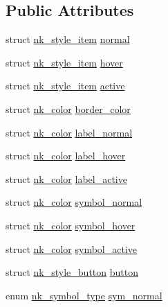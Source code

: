 \subsection*{Public Attributes}
\begin{DoxyCompactItemize}
\item 
struct \mbox{\hyperlink{structnk__style__item}{nk\+\_\+style\+\_\+item}} \mbox{\hyperlink{structnk__style__combo_a4eb30990e9b05c237cb40ddcd75fbc84}{normal}}
\item 
struct \mbox{\hyperlink{structnk__style__item}{nk\+\_\+style\+\_\+item}} \mbox{\hyperlink{structnk__style__combo_a7e43251b99975c9ec8069e77468698c1}{hover}}
\item 
struct \mbox{\hyperlink{structnk__style__item}{nk\+\_\+style\+\_\+item}} \mbox{\hyperlink{structnk__style__combo_aa8bd909d3b920864bf608d9358079d74}{active}}
\item 
struct \mbox{\hyperlink{structnk__color}{nk\+\_\+color}} \mbox{\hyperlink{structnk__style__combo_a560aa647e5759c9a7d27e6b88530d745}{border\+\_\+color}}
\item 
struct \mbox{\hyperlink{structnk__color}{nk\+\_\+color}} \mbox{\hyperlink{structnk__style__combo_a381df88d0500ee26c94654dfdceb9ff5}{label\+\_\+normal}}
\item 
struct \mbox{\hyperlink{structnk__color}{nk\+\_\+color}} \mbox{\hyperlink{structnk__style__combo_abd355bd2a43b1e6581746bd2a4f10c6e}{label\+\_\+hover}}
\item 
struct \mbox{\hyperlink{structnk__color}{nk\+\_\+color}} \mbox{\hyperlink{structnk__style__combo_a2b901e453b2f00de9c4ac0b7f5a4d975}{label\+\_\+active}}
\item 
struct \mbox{\hyperlink{structnk__color}{nk\+\_\+color}} \mbox{\hyperlink{structnk__style__combo_ae6acc5a734518b2d51f70e4c91657ea0}{symbol\+\_\+normal}}
\item 
struct \mbox{\hyperlink{structnk__color}{nk\+\_\+color}} \mbox{\hyperlink{structnk__style__combo_aec3460dac9cc591cc9a8da26f01d941f}{symbol\+\_\+hover}}
\item 
struct \mbox{\hyperlink{structnk__color}{nk\+\_\+color}} \mbox{\hyperlink{structnk__style__combo_a9b73b9d12d5dbefafee3d6e2ca8a534e}{symbol\+\_\+active}}
\item 
struct \mbox{\hyperlink{structnk__style__button}{nk\+\_\+style\+\_\+button}} \mbox{\hyperlink{structnk__style__combo_a5f0d632c9044b05bd2eb9a039cd82c47}{button}}
\item 
enum \mbox{\hyperlink{nuklear_8h_a29b4aaa400d0ce28aea3c8c9c372ac07}{nk\+\_\+symbol\+\_\+type}} \mbox{\hyperlink{structnk__style__combo_ab9bddd4bf005fe764cfc0e31760aa75a}{sym\+\_\+normal}}

\end{DoxyCompactItemize}
